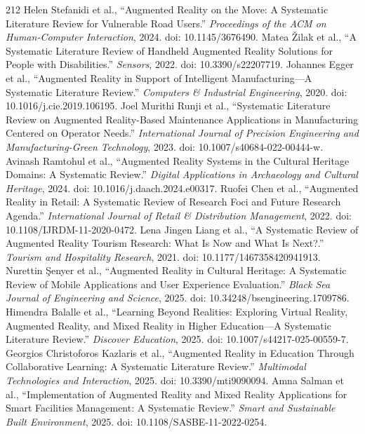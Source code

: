 \begin{thebibliography}{212}
 Helen Stefanidi et al., ``Augmented Reality on the Move: A Systematic Literature Review for Vulnerable Road Users.'' \emph{Proceedings of the ACM on Human-Computer Interaction}, 2024. doi: 10.1145/3676490.
 Matea {\v{Z}}ilak et al., ``A Systematic Literature Review of Handheld Augmented Reality Solutions for People with Disabilities.'' \emph{Sensors}, 2022. doi: 10.3390/s22207719.
 Johannes Egger et al., ``Augmented Reality in Support of Intelligent Manufacturing---A Systematic Literature Review.'' \emph{Computers \& Industrial Engineering}, 2020. doi: 10.1016/j.cie.2019.106195.
 Joel Murithi Runji et al., ``Systematic Literature Review on Augmented Reality-Based Maintenance Applications in Manufacturing Centered on Operator Needs.'' \emph{International Journal of Precision Engineering and Manufacturing-Green Technology}, 2023. doi: 10.1007/s40684-022-00444-w.
 Avinash Ramtohul et al., ``Augmented Reality Systems in the Cultural Heritage Domains: A Systematic Review.'' \emph{Digital Applications in Archaeology and Cultural Heritage}, 2024. doi: 10.1016/j.daach.2024.e00317.
 Ruofei Chen et al., ``Augmented Reality in Retail: A Systematic Review of Research Foci and Future Research Agenda.'' \emph{International Journal of Retail \& Distribution Management}, 2022. doi: 10.1108/IJRDM-11-2020-0472.
 Lena Jingen Liang et al., ``A Systematic Review of Augmented Reality Tourism Research: What Is Now and What Is Next?.'' \emph{Tourism and Hospitality Research}, 2021. doi: 10.1177/1467358420941913.
 Nurettin {\c{S}}enyer et al., ``Augmented Reality in Cultural Heritage: A Systematic Review of Mobile Applications and User Experience Evaluation.'' \emph{Black Sea Journal of Engineering and Science}, 2025. doi: 10.34248/bsengineering.1709786.
 Himendra Balalle et al., ``Learning Beyond Realities: Exploring Virtual Reality, Augmented Reality, and Mixed Reality in Higher Education---A Systematic Literature Review.'' \emph{Discover Education}, 2025. doi: 10.1007/s44217-025-00559-7.
 Georgios Christoforos Kazlaris et al., ``Augmented Reality in Education Through Collaborative Learning: A Systematic Literature Review.'' \emph{Multimodal Technologies and Interaction}, 2025. doi: 10.3390/mti9090094.
 Amna Salman et al., ``Implementation of Augmented Reality and Mixed Reality Applications for Smart Facilities Management: A Systematic Review.'' \emph{Smart and Sustainable Built Environment}, 2025. doi: 10.1108/SASBE-11-2022-0254.

\end{thebibliography}
